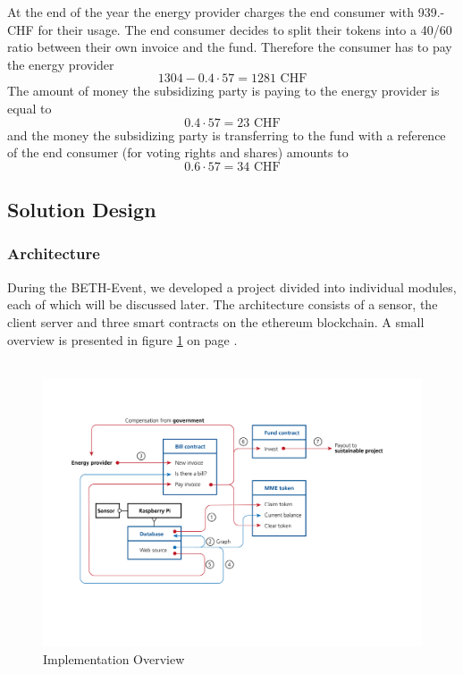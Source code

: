 \documentclass[11pt]{article}
\begin{document}
\noindent
At the end of the year the energy provider charges the end consumer with 939.- CHF for their usage. The end consumer decides to split their tokens into a 40/60 ratio between their own invoice and the fund. Therefore the consumer has to pay the energy provider
\begin{equation}
1304-0.4\cdot57=1281  \textrm{ CHF}
\end{equation}
The amount of money the subsidizing party is paying to the energy provider is equal to
\begin{equation}
0.4\cdot57=23 \textrm{ CHF}
\end{equation}
and the money the subsidizing party is transferring to the fund with a reference of the end consumer (for voting rights and shares) amounts to
\begin{equation}
0.6\cdot57=34 \textrm{ CHF}
\end{equation}

\subsection{Solution Design}
\subsubsection{Architecture}
During the BETH-Event, we developed a project divided into individual modules, each of which will be discussed later. The architecture consists of a sensor, the client server and three smart contracts on the ethereum blockchain. A small overview is presented in figure \ref{img_impl} on page \pageref{img_impl}.\\\\
\begin{figure}[ht]
	\begin{center}
		\includegraphics[scale=1.5]{../presentation/implementation.png}
		\caption{Implementation Overview}
		\label{img_impl}
	\end{center}
\end{figure}
\end{document}
